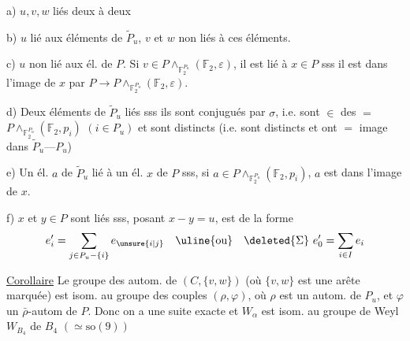 a) $u,v,w$ liés deux à deux

b) $u$ lié aux éléments de $\widetilde P_u$, $v$ et $w$ non liés à ces éléments.

c) $u$ non lié aux él. de  $P$. Si $v\in P\wedge_{\mathbb F_2^{P_u}}(\mathbb F_2,\varepsilon)$, il est lié à $x\in P$ sss il est dans l'image de $x$ par $P\longrightarrow P\wedge_{\mathbb F_2^{P_u}}(\mathbb F_2,\varepsilon)$.

d) Deux éléments de $\widetilde P_u$ liés sss ils sont conjugués par $\sigma$, i.e.   sont $\in$ des $=$  $P\wedge_{\mathbb F_2^{P_u}}(\mathbb F_2,p_i)$ $(i\in P_u)$ et sont distincts (i.e. sont distincts et ont $=$ image dans $\widetilde P_u\text{---}P_u$)

e)  Un él. $a$ de $\widetilde P_u$ lié à un él. $x$ de $P$ sss, si $a\in P\wedge_{\mathbb F_2^{P_u}}(\mathbb F_2,p_i)$, $a$ est dans l'image de $x$.

f) $x$ et $y\in P$ sont liés sss, posant $x-y=u$,  est de la forme 
\[
e'_i=\sum_{j\in P_u-\{i\}}e_{\unsure{i|j}}\quad\text{\uline{ou}}\quad\deleted{\Sigma}\ e'_0=\sum_{i\in I}e_i
\]

\noindent{}\uline{Corollaire} Le groupe des autom.  de $(C,\{v,w\})$ (où $\{v,w\}$ est une arête marquée) est isom. au groupe des couples $(\rho,\varphi)$, où $\rho$  est un autom. de  $P_u$, et $\varphi$ un $\bar\rho$-autom de $P$. Donc on a une suite exacte 
\noindent{}et $W_\alpha$ est isom. au groupe de Weyl $W_{B_4}$ de $B_4$ $(\simeq\mathrm{so}(9))$

